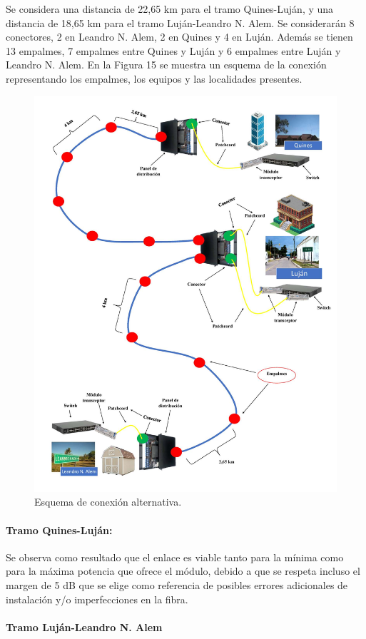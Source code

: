\documentclass[11pt,a4paper]{article}
\begin{document}
Se considera una distancia  de 22,65 km para el tramo Quines-Luján, y una distancia de 18,65 km para el tramo Luján-Leandro N. Alem. 
Se considerarán 8 conectores, 2 en Leandro N. Alem, 2 en Quines y 4 en Luján. Además se tienen 13 empalmes, 7 empalmes entre Quines y Luján y 6 empalmes entre Luján y Leandro N. Alem. 
En la Figura 15 se muestra un esquema de la conexión representando los empalmes, los equipos y las localidades presentes. 


\begin{figure}[htbp]
  \centering
  \includegraphics[width=0.7\linewidth]{fotos_ema/esq_enl_lujan.jpg}
  \caption{Esquema de conexión alternativa.}
  \label{fig:esq_enlace_lujan}
\end{figure}


\paragraph{Tramo Quines-Luján:}


Se observa como resultado que el enlace es viable tanto para la mínima como para la máxima potencia que ofrece el módulo, debido a que se respeta incluso el margen de 5 dB que se elige como referencia de posibles errores adicionales de instalación y/o imperfecciones en la fibra.

\paragraph{Tramo Luján-Leandro N. Alem}
\end{document}
